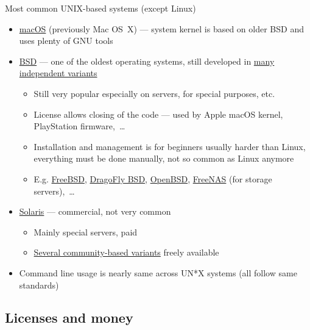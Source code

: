 \documentclass[compress, ucs, xelatex, 11pt, xcolor=svgnames,
  hyperref={
    bookmarks=true,
    unicode=true,
    colorlinks=true,
    pdftitle={Linux, command line and MetaCentrum},
    plainpages=false,
    pdfauthor={Vojtech Zeisek},
    pdfsubject={Course about use of Linux command line, writing shell scripts and using MetaCentrum of CESNET},
    pdfcreator={XeLaTeX},
    pdfkeywords={Linux, GNU, BASH, shell, command line, MetaCentrum},
    linkcolor=DarkRed,
    anchorcolor=DarkBlue,
    citecolor=Indigo,
    filecolor=NavyBlue,
    menucolor=DarkMagenta,
    urlcolor=DarkBlue,
    pdftex},
  url={hyphens, lowtilde} %
  ]{beamer}
\begin{document}
\begin{frame}{Most common UNIX-based systems (except Linux)}
  \begin{itemize}
    \item \href{https://en.wikipedia.org/wiki/MacOS}{macOS} (previously Mac OS~X) --- system kernel is based on older BSD and uses plenty of GNU tools
    \item \href{https://en.wikipedia.org/wiki/Berkeley_Software_Distribution}{BSD} --- one of the oldest operating systems, still developed in \href{https://distrowatch.com/search.php?ostype=BSD}{many independent variants}
    \begin{itemize}
      \item Still very popular especially on servers, for special purposes, etc.
      \item License allows closing of the code --- used by Apple macOS kernel, PlayStation firmware,~\ldots
      \item Installation and management is for beginners usually harder than Linux, everything must be done manually, not so common as Linux anymore
      \item E.g. \href{https://www.freebsd.org/}{FreeBSD}, \href{https://www.dragonflybsd.org/}{DragoFly BSD}, \href{https://www.openbsd.org/}{OpenBSD}, \href{http://www.freenas.org/}{FreeNAS} (for storage servers),~\ldots
    \end{itemize}
    \item \href{https://en.wikipedia.org/wiki/Solaris_(operating_system)}{Solaris} --- commercial, not very common
    \begin{itemize}
      \item Mainly special servers, paid
      \item \href{https://distrowatch.com/search.php?ostype=Solaris}{Several community-based variants} freely available
    \end{itemize}
    \item Command line usage is nearly same across UN*X systems (all follow same standards)
  \end{itemize}
\end{frame}

\subsection{Licenses and money}
\end{document}
